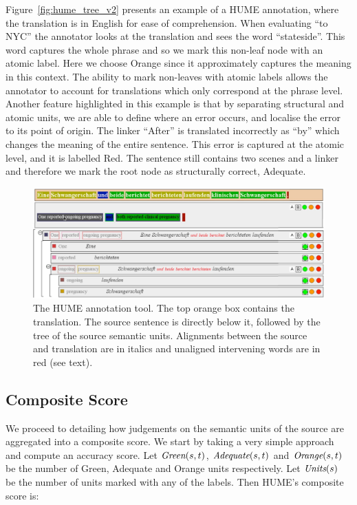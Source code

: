 \documentclass[11pt,letterpaper]{article}
\def\func#1{\text{\it #1}}  %
\def\Adequate{\func{Adequate}}
\def\Green{\func{Green}}
\def\Orange{\func{Orange}}
\def\Units{\func{Units}}
\begin{document}
Figure~\ref{fig:hume_tree_v2} presents an example of a HUME
annotation, where the translation is in English for ease of comprehension.
When evaluating ``to NYC'' the annotator looks at the translation and sees the
word ``stateside''. This word captures the whole phrase and so we mark this
non-leaf node with an atomic label. Here we choose Orange since
it approximately captures the meaning in this context.
The ability to mark non-leaves with atomic labels allows
the annotator to account for translations which only correspond at the phrase
level. Another feature highlighted in this example is that by separating structural
and atomic units, we are able to define where an error occurs, and localise
the error to its point of origin. The linker ``After'' is translated incorrectly as ``by''
which changes the meaning of the entire sentence. This error is captured at
the atomic level, and it is labelled Red. The sentence still contains two scenes and
a linker and therefore we mark the root node as structurally correct, Adequate.

\begin{figure}[t]
    \begin{center}
    \includegraphics[width=.8\textwidth]{hume_interface2.jpg}
    \caption{The HUME annotation tool. The top orange box
      contains the translation. The source sentence is directly below it, followed by the tree of the source
      semantic units. Alignments between the source and translation are in italics and
      unaligned intervening words are in red (see text).}
    \label{fig:interface}
    \end{center}
\end{figure}


\subsection{Composite Score}\label{sec:score}

We proceed to detailing how judgements on the semantic units
of the source are aggregated into a composite score. 
We start by taking a very simple approach and compute an accuracy score.
Let $\Green(s,t)$, $\Adequate(s,t)$ and $\Orange(s,t)$ be the number of Green, Adequate and Orange
units respectively. Let $\Units(s)$ be the number of units marked with any of the labels.
Then HUME's composite score is:
\end{document}
